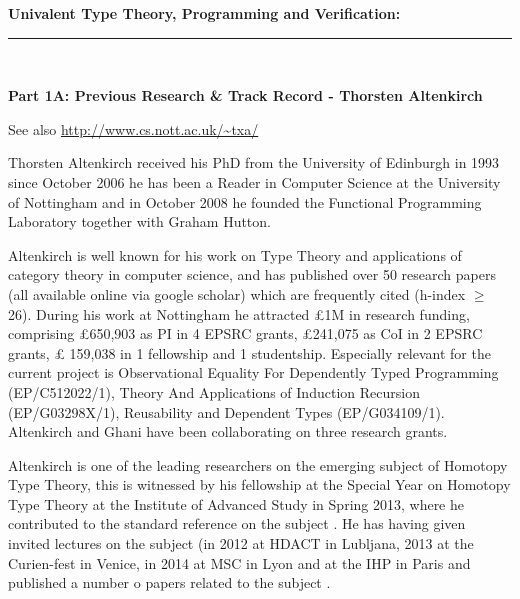 \documentclass[a4paper,11pt]{article}
\begin{document}
\thispagestyle{plain}
\begin{center}
  {\Large {\bf Univalent Type Theory, Programming and Verification:}}\\[1ex] 

\vspace*{-0.1in}

  \rule{140mm}{.5mm}\\[2ex]
\end{center}

\noindent
{\bf \Large Part 1A: Previous Research \& Track Record - 
Thorsten Altenkirch}

\vspace{0.05in}


\noindent
See also \url{http://www.cs.nott.ac.uk/~txa/}

\vspace{0.05in}
Thorsten Altenkirch received his PhD from the University of
Edinburgh in 1993 since October 2006 he has been a Reader in
Computer Science at the University of Nottingham and in October
2008 he founded  the Functional Programming Laboratory together with
Graham Hutton.

Altenkirch is well known for his work on Type Theory and applications
of category theory in computer science, and has published over 50
research papers (all available online via google scholar) which are
frequently cited (h-index $\geq$ 26). During his work at Nottingham he attracted
\pounds 1M in research funding, comprising \pounds 650,903 as PI in 4
EPSRC grants, \pounds 241,075 as CoI in 2 EPSRC grants, \pounds
159,038 in 1 fellowship and 1 studentship. Especially relevant for the
current project is Observational Equality For Dependently Typed Programming
(EP/C512022/1), Theory And Applications of Induction Recursion (EP/G03298X/1),
Reusability and Dependent Types (EP/G034109/1). Altenkirch and Ghani have been  collaborating on
three research grants.

Altenkirch is one of the leading researchers on the emerging subject of Homotopy Type Theory,
this is witnessed by his fellowship at the Special Year on Homotopy
Type Theory at the Institute of Advanced Study in Spring 2013, where he contributed to the standard reference on the subject \cite{hott}. 
He has 
having given invited lectures on the subject (in 2012 at HDACT in
Lubljana, 2013 at the Curien-fest in Venice, in 2014 at MSC in Lyon
and at the IHP in Paris and published a number o papers related to the subject 
\cite{alti:lics99,alti:ott-conf,alti:csl12,alti:tlca13-hedberg}.
\end{document}
